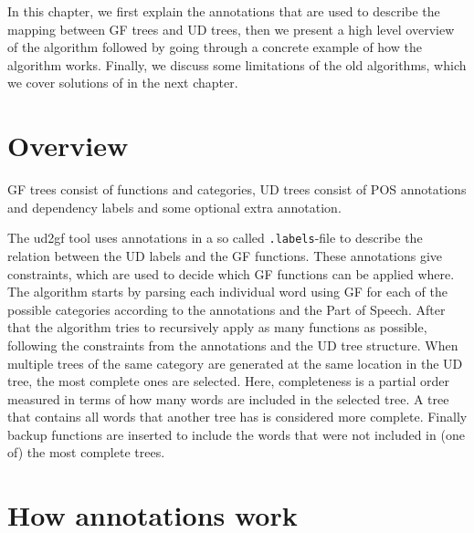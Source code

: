 





In this chapter, we first explain the annotations that are used to describe the mapping between \ac{GF} trees and \ac{UD} trees, then we present a high level overview of the algorithm followed by going through a concrete example of how the algorithm works. Finally, we discuss some limitations of the old algorithms, which we cover solutions of in the next chapter.

\section{Overview}


\ac{GF} trees consist of functions and categories, \ac{UD} trees consist of \ac{POS} annotations and dependency labels and some optional extra annotation.

The ud2gf tool uses annotations in a so called \verb|.labels|-file to describe the relation between the \ac{UD} labels and the \ac{GF} functions. These annotations give constraints, which are used to decide which \ac{GF} functions can be applied where. The algorithm starts by parsing each individual word using \ac{GF} for each of the possible categories according to the annotations and the Part of Speech. After that the algorithm tries to recursively apply as many functions as possible, following the constraints from the annotations and the \ac{UD} tree structure. When multiple trees of the same category are generated at the same location in the \ac{UD} tree, the most complete ones are selected. Here, completeness is a partial order measured in terms of how many words are included in the selected tree. A tree that contains all words that another tree has is considered more complete. Finally backup functions are inserted to include the words that were not included in (one of) the most complete trees.

\section{How annotations work}\label{sec:annotations-intro}

